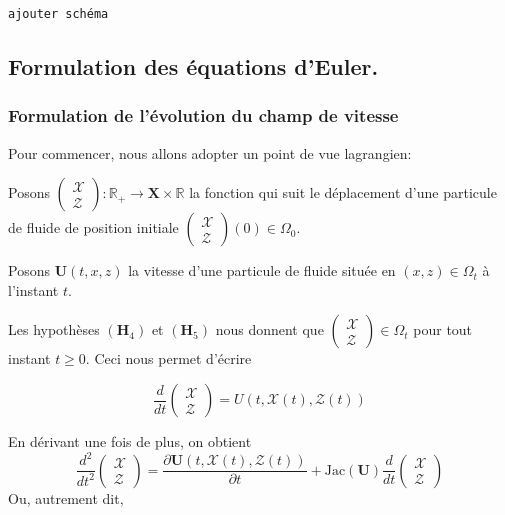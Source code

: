 \documentclass[12pt,a4paper]{article}
\numberwithin{equation}{section}
\begin{document}
\begin{center}
    \texttt{ajouter schéma}
\end{center}


\subsection{Formulation des équations d'Euler.}
\subsubsection{Formulation de l'évolution du champ de vitesse}
Pour commencer, nous allons adopter un point de vue lagrangien:
\begin{list}{}{}
    \item[\textbullet] Posons $\left(\begin{array}{l}
         \mathcal{X}\\
         \mathcal{Z}
    \end{array}\right) :  \mathbb{R}_+ \rightarrow \textbf{X}\times\mathbb{R}$ la fonction qui suit le déplacement d'une particule de fluide de position initiale $\left(\begin{array}{l}
         \mathcal{X}\\
         \mathcal{Z}
    \end{array}\right)(0)  \in \Omega_0$.
    \item[\textbullet] Posons $\textbf{U}(t,x,z)$ la vitesse d'une particule de fluide située en $(x,z) \in \Omega_t$ à l'instant $t$.
\end{list}
Les hypothèses $(\textbf{H}_4)$ et $(\textbf{H}_5)$ nous donnent que $\left(\begin{array}{l}
         \mathcal{X}\\
         \mathcal{Z}
\end{array}\right)\in \Omega_t$ pour tout instant $t \geq 0$. Ceci nous permet d'écrire
    
\begin{equation}
\frac{d}{dt} \left(\begin{array}{l}
         \mathcal{X}\\
         \mathcal{Z}
\end{array}\right) = U(t,\mathcal{X}(t), \mathcal{Z}(t)) 
\end{equation}

En dérivant une fois de plus, on obtient 
$$
\frac{d^2 }{dt^2}\left(\begin{array}{l}
         \mathcal{X}\\
         \mathcal{Z}
\end{array}\right)  = \frac{\partial \textbf{U}(t,\mathcal{X}(t),\mathcal{Z}(t))}{\partial t} + \text{Jac}(\textbf{U})\frac{d}{d t}\left(\begin{array}{l}
         \mathcal{X}\\
         \mathcal{Z}
\end{array}\right) 
$$
    Ou, autrement dit,
    
\end{document}
